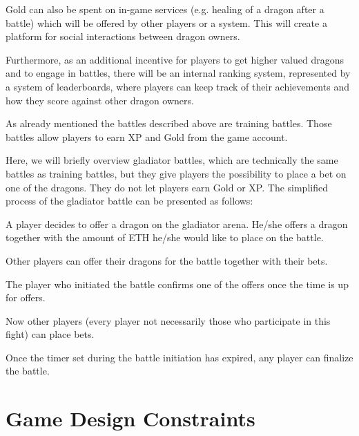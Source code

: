 \documentclass[12pt]{article}
\begin{document}
Gold can also be spent on in-game services (e.g. healing of a dragon after a battle) which will be offered by other players or a system. This will create a platform for social interactions between dragon owners.\par

Furthermore, as an additional incentive for players to get higher valued dragons and to engage in battles, there will be an internal ranking system, represented by a system of leaderboards, where players can keep track of their achievements and how they score against other dragon owners.\par

As already mentioned the battles described above are training battles. Those battles allow players to earn XP and Gold from the game account.\par

Here, we will briefly overview gladiator battles, which are technically the same battles as training battles, but they give players the possibility to place a bet on one of the dragons. They do not let players earn Gold or XP. The simplified process of the gladiator battle can be presented as follows:\par


\begin{itemize}
  \begin{samepage}
    \item A player decides to offer a dragon on the gladiator arena. He/she offers a dragon together with the amount of ETH he/she would like to place on the battle.
    \item Other players can offer their dragons for the battle together with their bets.
    \item The player who initiated the battle confirms one of the offers once the time is up for offers.
    \item Now other players (every player not necessarily those who participate in this fight) can place bets.
    \item Once the timer set during the battle initiation has expired, any player can finalize the battle.
  \end{samepage}
\end{itemize}


\newpage
\vspace{\baselineskip}\section{Game Design Constraints}
\label{Game Design Constraints}   \par
\end{document}
